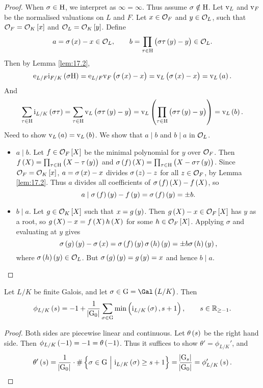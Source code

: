 \begin{proof}
When $ \sigma \in \mathrm{H} $, we interpret as $ \infty = \infty $. Thus assume $ \sigma \notin \mathrm{H} $. Let $ \mathrm{v}_L $ and $ \mathrm{v}_F $ be the normalised valuations on $ L $ and $ F $. Let $ x \in \mathcal{O}_F $ and $ y \in \mathcal{O}_L $, such that $ \OOO_F = \OOO_K\sbr{x} $ and $ \OOO_L = \OOO_K\sbr{y} $. Define
$$ a = \sigma\br{x} - x \in \OOO_L, \qquad b = \prod_{\tau \in \H} \br{\sigma\tau\br{y} - y} \in \OOO_L. $$
Then by Lemma \ref{lem:17.2},
$$ \e_{L / F}\i_{F / K}\br{\sigma\H} = \e_{L / F}\v_F\br{\sigma\br{x} - x} = \v_L\br{\sigma\br{x} - x} = \v_L\br{a}. $$
And
$$ \sum_{\tau \in \H} \i_{L / K}\br{\sigma\tau} = \sum_{\tau \in \H} \v_L\br{\sigma\tau\br{y} - y} = \v_L\br{\prod_{\tau \in \H} \br{\sigma\tau\br{y} - y}} = \v_L\br{b}. $$
Need to show $ \v_L\br{a} = \v_L\br{b} $. We show that $ a \mid b $ and $ b \mid a $ in $ \mathcal{O}_L $.
\begin{itemize}
\item $ a \mid b $. Let $ f \in \OOO_F\sbr{X} $ be the minimal polynomial for $ y $ over $ \mathcal{O}_F $. Then $ f\br{X} = \prod_{\tau \in \H} \br{X - \tau\br{y}} $ and $ \sigma\br{f}\br{X} = \prod_{\tau \in \H} \br{X - \sigma\tau\br{y}} $. Since $ \OOO_F = \OOO_K\sbr{x} $, $ a = \sigma\br{x} - x $ divides $ \sigma\br{z} - z $ for all $ z \in \mathcal{O}_F $, by Lemma \ref{lem:17.2}. Thus $ a $ divides all coefficients of $ \sigma\br{f}\br{X} - f\br{X} $, so
$$ a \mid \sigma\br{f}\br{y} - f\br{y} = \sigma\br{f}\br{y} = \pm b. $$
\item $ b \mid a $. Let $ g \in \OOO_K\sbr{X} $ such that $ x = g\br{y} $. Then $ g\br{X} - x \in \OOO_F\sbr{X} $ has $ y $ as a root, so $ g\br{X} - x = f\br{X}h\br{X} $ for some $ h \in \OOO_F\sbr{X} $. Applying $ \sigma $ and evaluating at $ y $ gives
$$ \sigma\br{g}\br{y} - \sigma\br{x} = \sigma\br{f}\br{y}\sigma\br{h}\br{y} = \pm b\sigma\br{h}\br{y}, $$
where $ \sigma\br{h}\br{y} \in \OOO_L $. But $ \sigma\br{g}\br{y} = g\br{y} = x $ and hence $ b \mid a $.
\end{itemize}
\end{proof}

\begin{lemma}
\label{lem:17.4}
Let $ L / K $ be finite Galois, and let $ \sigma \in \G = \Gal\br{L / K} $. Then
$$ \phi_{L / K}\br{s} = -1 + \dfrac{1}{\abs{\G_0}}\sum_{\sigma \in \G} \min\br{\i_{L / K}\br{\sigma}, s + 1}, \qquad s \in \RR_{\ge -1}. $$
\end{lemma}

\begin{proof}
Both sides are piecewise linear and continuous. Let $ \theta\br{s} $ be the right hand side. Then $ \phi_{L / K}\br{-1} = -1 = \theta\br{-1} $. Thus it suffices to show $ \theta' = \phi_{L / K}' $, and
$$ \theta'\br{s} = \dfrac{1}{\abs{\G_0}} \cdot \#\cbr{\sigma \in \G \st \i_{L / K}\br{\sigma} \ge s + 1} = \dfrac{\abs{\G_s}}{\abs{\G_0}} = \phi_{L / K}'\br{s}. $$
\end{proof}

